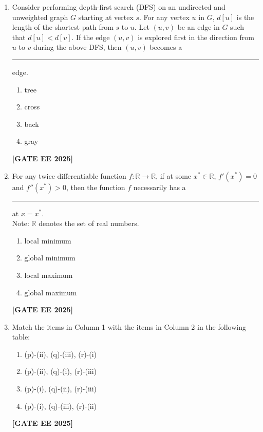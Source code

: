 \documentclass[journal]{IEEEtran}
\newcommand{\qfooter}{%
  \begin{flushright}\footnotesize\textbf{[GATE EE 2025]}\end{flushright}\vspace{1em}%
}
\begin{document}
\begin{enumerate}
\item Consider performing depth-first search (DFS) on an undirected and unweighted graph $G$ starting at vertex $s$. For any vertex $u$ in $G$, $d[u]$ is the length of the shortest path from $s$ to $u$. Let $(u, v)$ be an edge in $G$ such that $d[u] < d[v]$. If the edge $(u, v)$ is explored first in the direction from $u$ to $v$ during the above DFS, then $(u, v)$ becomes a \rule{7em}{0.07em} edge.
\begin{multicols}{4}
\begin{enumerate}
\item tree
\item cross
\item back
\item gray
\end{enumerate}
\qfooter
\end{multicols}

\item For any twice differentiable function $f: \mathbb{R} \rightarrow \mathbb{R}$, if at some $x^*\in \mathbb{R}$, $f'(x^*)=0$ and $f''(x^*)>0$, then the function $f$ necessarily has a \rule{7em}{0.07em} at $x = x^*$.\\
Note: $\mathbb{R}$ denotes the set of real numbers.
\begin{multicols}{2}
\begin{enumerate}
\item local minimum
\item global minimum
\item local maximum
\item global maximum
\end{enumerate} \qfooter
\end{multicols}

\item Match the items in Column 1 with the items in Column 2 in the following table:

\begin{multicols}{2}
\begin{enumerate}
\item (p)-(ii), (q)-(iii), (r)-(i)
\item (p)-(ii), (q)-(i), (r)-(iii)
\item (p)-(i), (q)-(ii), (r)-(iii)
\item (p)-(i), (q)-(iii), (r)-(ii)
\end{enumerate} \qfooter
\end{multicols}


\end{enumerate}
\end{document}
